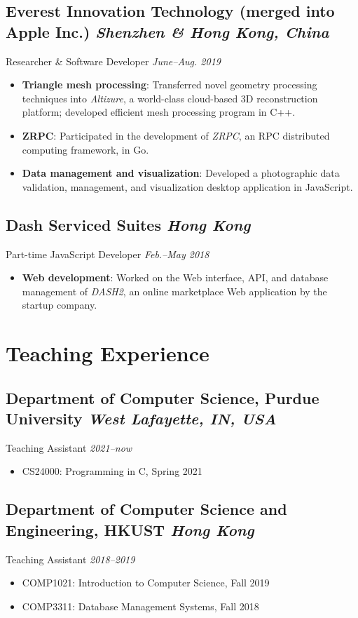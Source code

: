 \documentclass[11pt]{article}
\newcommand{\subsec}[2]{\subsection*{#1 \hfill {\normalfont\itshape #2}}}
\newcommand{\subsecdesc}[2]{{#1 \hfill \itshape #2}}
\begin{document}
  \subsec{Everest Innovation Technology \small{(merged into Apple Inc.)}}
         {Shenzhen \& Hong Kong, China}
  \subsecdesc{Researcher \& Software Developer}
             {June--Aug. 2019}
  \begin{itemize}
    \item \textbf{Triangle mesh processing}: Transferred novel geometry
      processing techniques into \emph{Altizure}, a world-class cloud-based 3D
      reconstruction platform; developed efficient mesh processing program in
      C++.
    \item \textbf{ZRPC}: Participated in the development of \emph{ZRPC}, an RPC
      distributed computing framework, in Go.
    \item \textbf{Data management and visualization}: Developed a photographic
      data validation, management, and visualization desktop application in
      JavaScript.
  \end{itemize}

  \subsec{Dash Serviced Suites}
         {Hong Kong}
  \subsecdesc{Part-time JavaScript Developer}
             {Feb.--May 2018}
  \begin{itemize}
    \item \textbf{Web development}: Worked on the Web interface, API, and
      database management of \emph{DASH2}, an online marketplace Web application
      by the startup company.
  \end{itemize}

\section*{Teaching Experience} %

  \subsec{Department of Computer Science, Purdue University}
         {West Lafayette, IN, USA}
  \subsecdesc{Teaching Assistant}
             {2021--now}
  \begin{itemize}
    \item CS24000: Programming in C, Spring 2021
  \end{itemize}

  \subsec{Department of Computer Science and Engineering, HKUST}
         {Hong Kong}
  \subsecdesc{Teaching Assistant}
             {2018--2019}
  \begin{itemize}
    \item COMP1021: Introduction to Computer Science, Fall 2019
    \item COMP3311: Database Management Systems, Fall 2018
  \end{itemize}
\end{document}
